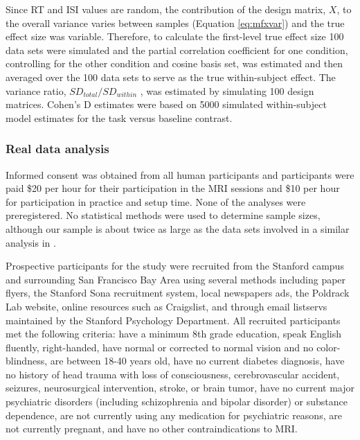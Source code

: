 \documentclass[sn-mathphys,Numbered, super, referee, lineno]{sn-jnl}
\begin{document}
Since RT and ISI values are random, the contribution of the design matrix, $X$, to the overall variance varies between samples (Equation \ref{eq:mfxvar}) and the true effect size was variable.  Therefore, to calculate the first-level true effect size 100 data sets were simulated and the partial correlation coefficient for one condition, controlling for the other condition and cosine basis set, was estimated and then averaged over the 100 data sets to serve as the true within-subject effect. The variance ratio, $SD_{total}/SD_{within}$ , was estimated by simulating 100 design matrices.  Cohen's D estimates were based on 5000 simulated within-subject model estimates for the task versus baseline contrast.

\subsubsection*{Real data analysis}

Informed consent was obtained from all human participants and participants were paid \$20 per hour for their participation in the MRI sessions and \$10 per hour for participation in practice and setup time. None of the analyses were preregistered. No statistical methods were used to determine sample sizes, although our sample is about twice as large as the data sets involved in a similar analysis in \citet{yarkoni_bold_2009}.  

Prospective participants for the study were recruited from the Stanford campus and surrounding San Francisco Bay Area using several methods including paper flyers, the Stanford Sona recruitment system, local newspapers ads, the Poldrack Lab website, online resources such as Craigslist, and through email listservs maintained by the Stanford Psychology Department. All recruited participants met the following criteria: have a minimum 8th grade education, speak English fluently, right-handed, have normal or corrected to normal vision and no color-blindness, are between 18-40 years old, have no current diabetes diagnosis, have no history of head trauma with loss of consciousness, cerebrovascular accident, seizures, neurosurgical intervention, stroke, or brain tumor, have no current major psychiatric disorders (including schizophrenia and bipolar disorder) or substance dependence, are not currently using any medication for psychiatric reasons, are not currently pregnant, and have no other contraindications to MRI.
\end{document}
